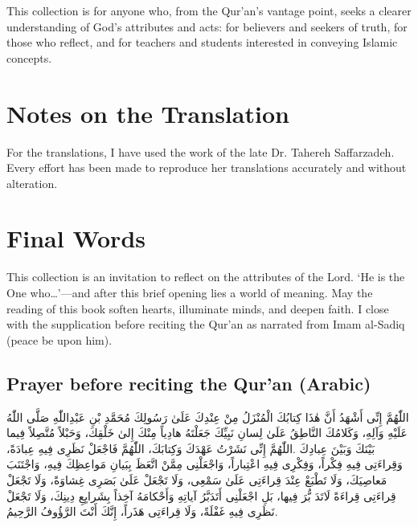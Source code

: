 This collection is for anyone who, from the Qur'an's vantage point, seeks a clearer understanding of God's attributes and acts: for believers and seekers of truth, for those who reflect, and for teachers and students interested in conveying Islamic concepts.

\section{Notes on the Translation}

For the translations, I have used the work of the late Dr. Tahereh Saffarzadeh. Every effort has been made to reproduce her translations accurately and without alteration.

\section{Final Words}

This collection is an invitation to reflect on the attributes of the Lord. `He is the One who\ldots'---and after this brief opening lies a world of meaning. May the reading of this book soften hearts, illuminate minds, and deepen faith. I close with the supplication before reciting the Qur'an as narrated from Imam al-Sadiq (peace be upon him).

\subsection{Prayer before reciting the Qur'an (Arabic)}

\begin{center}
\begin{Arabic}
اللّٰهُمَّ إِنِّى أَشْهَدُ أَنَّ هٰذَا كِتابُكَ الْمُنْزَلُ مِنْ عِنْدِكَ عَلَىٰ رَسُولِكَ مُحَمَّدِ بْنِ عَبْدِاللّٰهِ صَلَّى اللّٰهُ عَلَيْهِ وَآلِهِ، وَكَلامُكَ النَّاطِقُ عَلَىٰ لِسانِ نَبِيِّكَ جَعَلْتَهُ هادِياً مِنْكَ إِلىٰ خَلْقِكَ، وَحَبْلاً مُتَّصِلاً فِيما بَيْنَكَ وَبَيْنَ عِبادِكَ .اللّٰهُمَّ إِنِّى نَشَرْتُ عَهْدَكَ وَكِتابَكَ، اللّٰهُمَّ فَاجْعَلْ نَظَرِى فِيهِ عِبادَةً، وَقِراءَتِى فِيهِ فِكْراً، وَفِكْرِى فِيهِ اعْتِباراً، وَاجْعَلْنِى مِمَّنْ اتَّعَظَ بِبَيانِ مَواعِظِكَ فِيهِ، وَاجْتَنَبَ مَعاصِيَكَ، وَلَا تَطْبَعْ عِنْدَ قِراءَتِى عَلَىٰ سَمْعِى، وَلَا تَجْعَلْ عَلَىٰ بَصَرِى غِشاوَةً، وَلَا تَجْعَلْ قِراءَتِى قِراءَةً لَاتَدَ بُّرَ فِيها، بَلِ اجْعَلْنِى أَتَدَبَّرُ آياتِهِ وَأَحْكامَهُ آخِذاً بِشَرايِعِ دِينِكَ، وَلَا تَجْعَلْ نَظَرِى فِيهِ غَفْلَةً، وَلَا قِراءَتِى هَذَراً، إِنَّكَ أَنْتَ الرَّؤُوفُ الرَّحِيمُ.
\end{Arabic}
\end{center}

